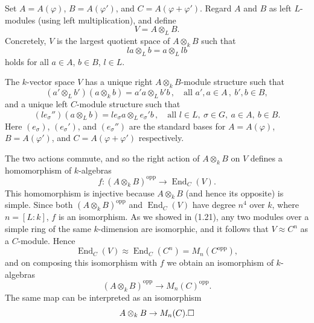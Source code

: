 Set $A=A(\varphi)$, $B=A(\varphi')$, and $C=A(\varphi+\varphi')$. Regard $A$ and $B$ as left $L$-modules (using left multiplication), and define
\[
V=A\otimes_L B.
\]
Concretely, $V$ is the largest quotient space of $A\otimes_k B$ such that
\[
la\otimes_L b=a\otimes_L lb
\]
holds for all $a\in A$, $b\in B$, $l\in L$.

The $k$-vector space $V$ has a unique right $A\otimes_k B$-module structure such that
\[
(a'\otimes_L b')(a\otimes_k b)=a'a\otimes_L b'b\,,\quad\text{all } a',a\in A\,,\ b',b\in B,
\]
and a unique left $C$-module structure such that
\[
(le_\sigma'')(a\otimes_L b)=le_\sigma a\otimes_L e_\sigma' b\,,\quad\text{all } l\in L,\ \sigma\in G,\ a\in A,\ b\in B.
\]
Here $(e_\sigma)$, $(e_\sigma')$, and $(e_\sigma'')$ are the standard bases for $A=A(\varphi)$, $B=A(\varphi')$, and $C=A(\varphi+\varphi')$ respectively.

The two actions commute, and so the right action of $A\otimes_k B$ on $V$ defines a homomorphism of $k$-algebras
\[
f\colon(A\otimes_k B)^{\mathrm{opp}}\to\operatorname{End}_C(V).
\]
This homomorphism is injective because $A\otimes_k B$ (and hence its opposite) is simple. Since both $(A\otimes_k B)^{\mathrm{opp}}$ and $\operatorname{End}_C(V)$ have degree $n^4$ over $k$, where $n=[L:k]$, $f$ is an isomorphism. As we showed in (1.21), any two modules over a simple ring of the same $k$-dimension are isomorphic, and it follows that $V\approx C^n$ as a $C$-module. Hence
\[
\operatorname{End}_C(V)\approx\operatorname{End}_C(C^n)=M_n(C^{\mathrm{opp}}),
\]
and on composing this isomorphism with $f$ we obtain an isomorphism of $k$-algebras
\[
(A\otimes_k B)^{\mathrm{opp}}\to M_n(C)^{\mathrm{opp}}.
\]
The same map can be interpreted as an isomorphism
\[
A\otimes_k B\to M_n(C). \hfill\square
\]
